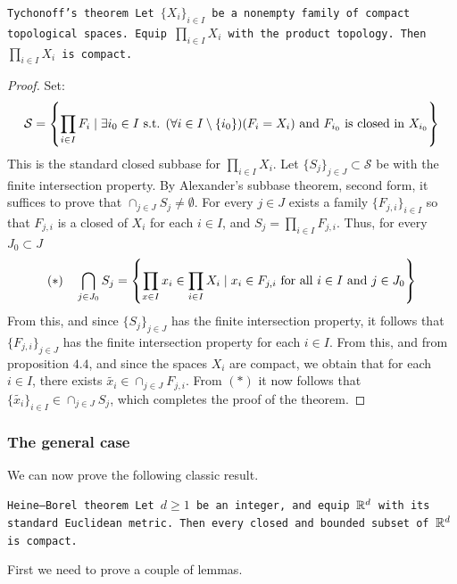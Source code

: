 \documentclass[11pt,a4paper]{article}
\begin{document}
\begin{theorem}
  \tt{Tychonoff’s theorem}
  Let $\{X_i\}_{i \in I}$ be a nonempty family of compact topological 
  spaces. Equip $\prod_{i \in I}{X_i}$ with the product topology. Then 
  $\prod_{i \in I}{X_i}$ is compact.
\end{theorem}
\begin{proof}
  Set:
  \[
    \mathcal{S} = 
    \left\{\prod_{i \in I}{F_i} \mid \exists i_0 \in I \text{ s.t. }
    (\forall i \in I \setminus \{i_0\})(F_i = X_i) \text{ and }
    F_{i_0} \text{ is closed in } X_{i_0}
    \right\}
  \]
  This is the standard closed subbase for $\prod_{i \in I}{X_i}$.
  Let $\{S_j\}_{j \in J} \subset \mathcal{S}$ be with the finite
  intersection property. By Alexander's subbase theorem, second form, 
  it suffices to prove that $\cap_{j \in J}{S_j} \neq \emptyset$.
  For every $j \in J$ exists a family $\{F_{j,i}\}_{i \in I}$ so that
  $F_{j,i}$ is a closed of $X_i$ for each $i \in I$, and 
  $S_j = \prod_{i \in I}{F_{j,i}}$. Thus, for every $J_0 \subset J$
  \[
    (*) \quad \bigcap_{j \in J_0}{{S}_j} = 
    \left\{\prod_{x \in I}{x_i} \in \prod_{i \in I}{X_i} \mid
    x_i \in F_{j,i} \text{ for all $i \in I$ and $j \in J_0$}\right\}
  \]
  From this, and since $\{S_j\}_{j \in J}$ has the finite intersection
  property, it follows that $\{F_{j,i}\}_{j \in J}$ has the finite
  intersection property for each $i \in I$. From this, and from 
  proposition $4.4$, and since the spaces $X_i$ are compact, we obtain
  that for each $i \in I$, there exists 
  $\tilde{x_i} \in \cap_{j \in J}{F_{j,i}}$. From $(*)$ it now follows
  that $\{\tilde{x_i}\}_{i \in I} \in \cap_{j \in J}{{S}_j}$, which
  completes the proof of the theorem.
\end{proof}

\subsubsection{The general case}

We can now prove the following classic result.

\begin{theorem}\label{thm:heine-borel}
  \tt{Heine–Borel theorem}
  Let $d \geq 1$ be an integer, and equip $\mathbb{R}^d$ with its standard 
  Euclidean metric. Then every closed and bounded subset of $\mathbb{R}^d$ is
  compact.
\end{theorem}

First we need to prove a couple of lemmas.
\end{document}
